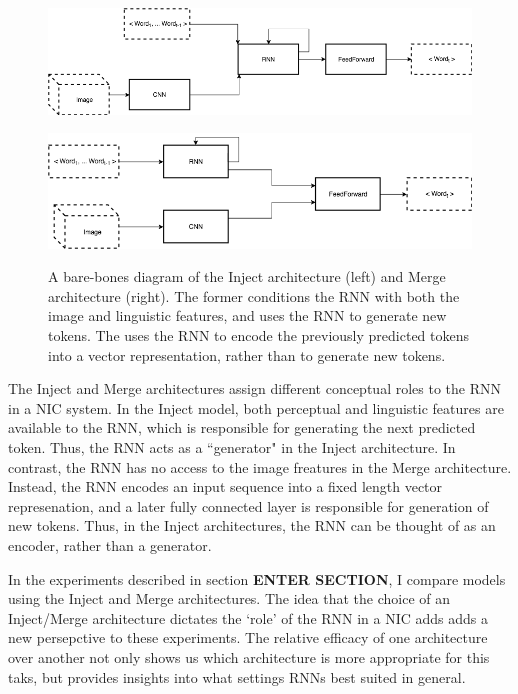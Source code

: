 \documentclass[letterpaper, 10 pt, conference]{ieeeconf}
\begin{document}
\begin{figure}[h]
\centering
\begin{minipage}{.5\textwidth}
  \centering
  \includegraphics[width=.85\linewidth]{inject_scheme}
  \label{fig:test1}
\end{minipage}%
\begin{minipage}{.5\textwidth}
  \centering
  \includegraphics[width=.85\linewidth]{merge_scheme}
  \label{fig:test2}
\end{minipage}
\caption{A bare-bones diagram of the Inject architecture (left) and Merge architecture (right). The former conditions the RNN with both the image and linguistic features, and uses the RNN to generate new tokens. The uses the RNN to encode the previously predicted tokens into a vector representation, rather than to generate new tokens.}
\end{figure}

The Inject and Merge architectures assign different conceptual roles to the RNN in a NIC system. In the Inject model, both perceptual and linguistic features are available to the RNN, which is responsible for generating the next predicted token. Thus, the RNN acts as a ``generator" in the Inject architecture. In contrast, the RNN has no access to the image freatures in the Merge architecture. Instead, the RNN encodes an input sequence into a fixed length vector represenation, and a later fully connected layer is responsible for generation of new tokens. Thus, in the Inject architectures, the RNN can be thought of as an encoder, rather than a generator. 

In the experiments described in section \textbf{ENTER SECTION}, I compare models using the Inject and Merge architectures. The idea that the choice of an Inject/Merge architecture dictates the `role' of the RNN in a NIC adds adds a new persepctive to these experiments. The relative efficacy of one architecture over another not only shows us which architecture is more appropriate for this taks, but provides insights into what settings RNNs best suited in general.  
\end{document}
